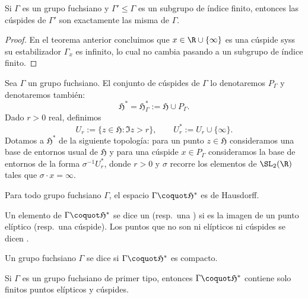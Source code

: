 \documentclass[teoria-numeros.tex]{subfiles}
\begin{document}
\begin{cor}
	Si $\Gamma$ es un grupo fuchsiano y $\Gamma' \le \Gamma$ es un subgrupo de índice finito,
	entonces las cúspides de $\Gamma'$ son exactamente las misma de $\Gamma$.
\end{cor}
\begin{proof}
	En el teorema anterior concluimos que $x \in \R\cup\{ \infty \}$ es una cúspide syss su estabilizador $\Gamma_x$ es infinito,
	lo cual no cambia pasando a un subgrupo de índice finito.
\end{proof}

\begin{mydef}
	Sea $\Gamma$ un grupo fuchsiano.
	El conjunto de cúspides de $\Gamma$ lo denotaremos $P_\Gamma$ y denotaremos también:
	\[
		\mathfrak{H}^* = \mathfrak{H}^*_\Gamma := \mathfrak{H} \cup P_\Gamma.
	\]
	Dado $r > 0$ real, definimos
	\[
		U_r := \{ z \in \mathfrak{H} : \Im z > r \}, \qquad U_r^* := U_r \cup \{ \infty \}.
	\]
	Dotamos a $\mathfrak{H}^*$ de la siguiente topología: para un punto $z \in \mathfrak{H}$ consideramos una base de entornos usual de $\mathfrak{H}$
	y para una cúspide $x \in P_\Gamma$ consideramos la base de entornos de la forma $\sigma^{-1}U_r^*$, donde $r > 0$ y $\sigma$ recorre los elementos
	de $\SL_2(\R)$ tales que $\sigma\cdot x = \infty$.
\end{mydef}
\begin{prop}
	Para todo grupo fuchsiano $\Gamma$, el espacio $\Gamma \coquot \mathfrak{H}^*$ es de Hausdorff.
\end{prop}

\begin{mydef}
	Un elemento de $\Gamma \coquot \mathfrak{H}^*$ se dice un  (resp.\ una )
	si es la imagen de un punto elíptico (resp.\ una cúspide).
	Los puntos que no son ni elípticos ni cúspides se dicen .

	Un grupo fuchsiano $\Gamma$ se dice  si $\Gamma \coquot \mathfrak{H}^*$ es compacto.
\end{mydef}
\begin{thm}
	Si $\Gamma$ es un grupo fuchsiano de primer tipo, entonces $\Gamma \coquot \mathfrak{H}^*$ contiene solo finitos puntos elípticos y cúspides.
\end{thm}
\end{document}
